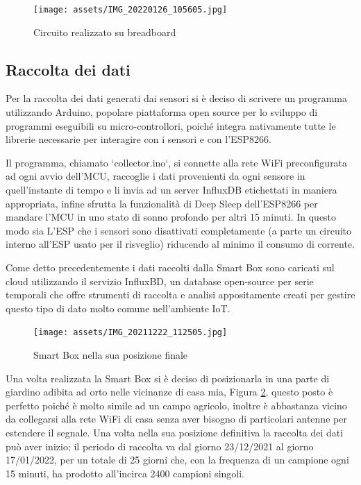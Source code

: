 \documentclass[a4paper, 12pt]{report}
\begin{document}
\begin{figure}[htbp]
\centering
\texttt{[image: assets/IMG\_20220126\_105605.jpg]}
\caption{Circuito realizzato su breadboard}
\label{fig:assembled}
\end{figure}

\subsection*{Raccolta dei dati}
\vspace{0.5cm}

Per la raccolta dei dati generati dai sensori si è deciso di scrivere un programma utilizzando Arduino\cite{arduino}, popolare piattaforma open source per lo sviluppo di programmi eseguibili su micro-controllori, poiché 
integra nativamente tutte le librerie necessarie per interagire con i sensori e con l'ESP8266. 

Il programma, chiamato `collector.ino`, si connette alla rete WiFi preconfigurata ad ogni avvio dell'MCU, raccoglie i dati provenienti da ogni sensore in quell'instante di tempo e li invia ad un server InfluxDB\cite{influxdb} 
etichettati in maniera appropriata, infine sfrutta la funzionalità di Deep Sleep dell'ESP8266 per mandare l'MCU in uno stato di sonno profondo per altri 15 minuti. In questo modo sia L'ESP che i sensori sono 
disattivati completamente (a parte un circuito interno all'ESP usato per il risveglio) riducendo al minimo il consumo di corrente.

Come detto precedentemente i dati raccolti dalla Smart Box sono caricati sul cloud utilizzando il servizio InfluxBD, un database open-source per serie temporali che offre strumenti di raccolta e analisi appositamente 
creati per gestire questo tipo di dato molto comune nell'ambiente IoT.

\begin{figure}[htbp]
\centering
\texttt{[image: assets/IMG\_20211222\_112505.jpg]}
\caption{Smart Box nella sua posizione finale}
\label{fig:inplace}
\end{figure}

Una volta realizzata la Smart Box si è deciso di posizionarla in una parte di giardino adibita ad orto nelle vicinanze di casa mia, Figura \ref{fig:inplace}, questo posto è perfetto poiché è molto simile ad un campo agricolo, 
inoltre è abbastanza vicino da collegarsi alla rete WiFi di casa senza aver bisogno di particolari antenne per estendere il segnale. 
Una volta nella sua posizione definitiva la raccolta dei dati può aver inizio; il periodo di raccolta va dal giorno 23/12/2021 al giorno 17/01/2022, per un totale di 25 giorni che, con la frequenza di un campione 
ogni 15 minuti, ha prodotto all'incirca 2400 campioni singoli.
\end{document}
